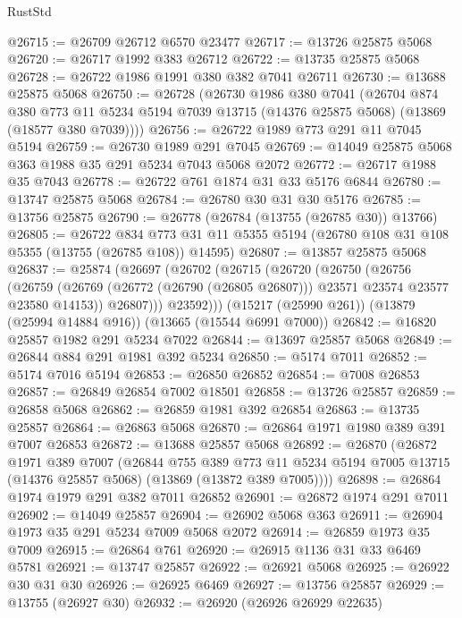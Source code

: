 \begin{lexlean}{RustStd}
\begin{coremodule}
@26715 := @26709 @26712 @6570 @23477
@26717 := @13726 @25875 @5068
@26720 := @26717 @1992 @383 @26712
@26722 := @13735 @25875 @5068
@26728 := @26722 @1986 @1991 @380 @382 @7041 @26711
@26730 := @13688 @25875 @5068
@26750 := @26728
    (@26730
      @1986
      @380
      @7041
      (@26704
        @874
        @380
        @773
        @11
        @5234
        @5194
        @7039
        @13715
        (@14376 @25875 @5068)
        (@13869 (@18577 @380 @7039))))
@26756 := @26722 @1989 @773 @291 @11 @7045 @5194
@26759 := @26730 @1989 @291 @7045
@26769 := @14049 @25875 @5068 @363 @1988 @35 @291 @5234 @7043 @5068 @2072
@26772 := @26717 @1988 @35 @7043
@26778 := @26722 @761 @1874 @31 @33 @5176 @6844
@26780 := @13747 @25875 @5068
@26784 := @26780 @30 @31 @30 @5176
@26785 := @13756 @25875
@26790 := @26778 (@26784 (@13755 (@26785 @30)) @13766)
@26805 := @26722
    @834
    @773
    @31
    @11
    @5355
    @5194
    (@26780 @108 @31 @108 @5355 (@13755 (@26785 @108)) @14595)
@26807 := @13857 @25875 @5068
@26837 := @25874
    (@26697
      (@26702
        (@26715
          (@26720
            (@26750
              (@26756
                (@26759
                  (@26769 (@26772 (@26790 (@26805 @26807))) @23571 @23574 @23577 @23580 @14153))
                @26807)))
          @23592)))
    (@15217 (@25990 @261))
    (@13879 (@25994 @14884 @916))
    (@13665 (@15544 @6991 @7000))
@26842 := @16820 @25857 @1982 @291 @5234 @7022
@26844 := @13697 @25857 @5068
@26849 := @26844 @884 @291 @1981 @392 @5234
@26850 := @5174 @7011
@26852 := @5174 @7016 @5194
@26853 := @26850 @26852
@26854 := @7008 @26853
@26857 := @26849 @26854 @7002 @18501
@26858 := @13726 @25857
@26859 := @26858 @5068
@26862 := @26859 @1981 @392 @26854
@26863 := @13735 @25857
@26864 := @26863 @5068
@26870 := @26864 @1971 @1980 @389 @391 @7007 @26853
@26872 := @13688 @25857 @5068
@26892 := @26870
    (@26872
      @1971
      @389
      @7007
      (@26844
        @755
        @389
        @773
        @11
        @5234
        @5194
        @7005
        @13715
        (@14376 @25857 @5068)
        (@13869 (@13872 @389 @7005))))
@26898 := @26864 @1974 @1979 @291 @382 @7011 @26852
@26901 := @26872 @1974 @291 @7011
@26902 := @14049 @25857
@26904 := @26902 @5068 @363
@26911 := @26904 @1973 @35 @291 @5234 @7009 @5068 @2072
@26914 := @26859 @1973 @35 @7009
@26915 := @26864 @761
@26920 := @26915 @1136 @31 @33 @6469 @5781
@26921 := @13747 @25857
@26922 := @26921 @5068
@26925 := @26922 @30 @31 @30
@26926 := @26925 @6469
@26927 := @13756 @25857
@26929 := @13755 (@26927 @30)
@26932 := @26920 (@26926 @26929 @22635)

\end{coremodule}
\end{lexlean}
